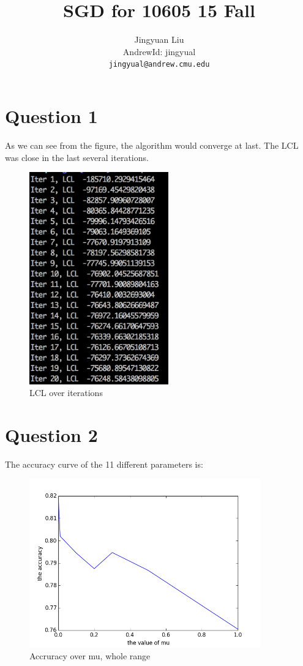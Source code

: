 \documentclass{article} %
\title{SGD for 10605 15 Fall}
\author{
Jingyuan Liu\\
AndrewId: jingyual\\
\texttt{jingyual@andrew.cmu.edu} \\
}
\begin{document}
\maketitle


\section{Question 1}

As we can see from the figure, the algorithm would converge at last. The LCL was close in the last several iterations.

\begin{figure}[h]
\begin{center}
\includegraphics[width=6cm]{pic/q1.png}
\end{center}
\caption{LCL over iterations}
\end{figure}

\section{Question 2}

The accuracy curve of the 11 different parameters is:

\begin{figure}[h]
\begin{center}
\includegraphics[width=10cm]{pic/q21.png}
\end{center}
\caption{Accruracy over mu, whole range}
\end{figure}
\end{document}
